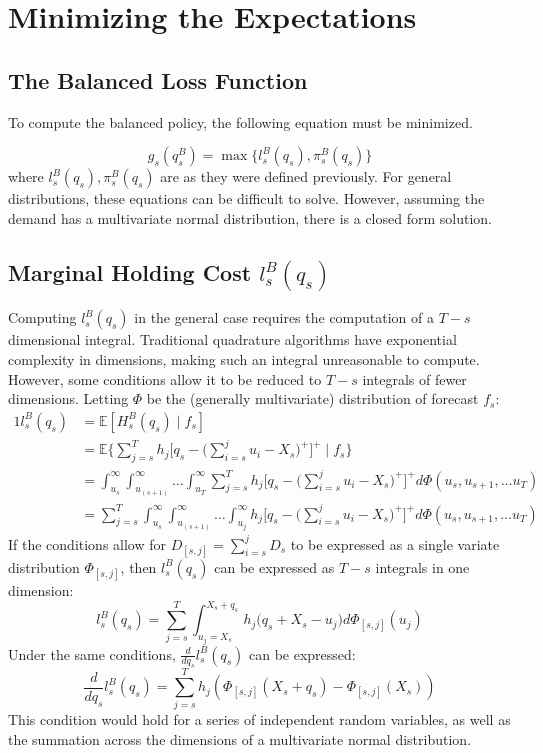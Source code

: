 \documentclass[12pt]{report}
\newcommand{\EX}{\mathbb{E}}
\begin{document}
\section{Minimizing the Expectations}

\subsection{The Balanced Loss Function}

To compute the balanced policy, the following equation must be minimized.

$$
	g_s(q_s^B) = \max\{l_s^B(q_s), \pi_s^B(q_s)\}
$$
where $l_s^B(q_s), \pi_s^B(q_s)$ are as they were defined previously. For general distributions, these equations can be difficult to solve. However, assuming the demand has a multivariate normal distribution, there is a closed form solution.  

\subsection{Marginal Holding Cost $l_s^B(q_s)$}

Computing $l_s^B(q_s)$ in the general case requires the computation of a $T - s$ dimensional integral. Traditional quadrature algorithms have exponential complexity in dimensions, making such an integral unreasonable to compute. However, some conditions allow it to be reduced to $T-s$ integrals of fewer dimensions. Letting $\Phi$ be the (generally multivariate) distribution of forecast $f_s$: 
\begin{alignat*}{1}
	l_s^B(q_s) &= \EX [H_s^B(q_s) \; | \; f_s] \\
        &= \EX \bigg\{\sum_{j=s}^T h_j\bigg[q_s - \bigg(\sum_{i=s}^j u_i - X_s\bigg)^+\bigg]^+  \; | \; f_s \bigg\} \\
		&= \int_{u_s}^{\infty} \int_{u_{(s+1)}}^{\infty}\dots \int_{u_T}^{\infty}\sum_{j=s}^T h_j\bigg[q_s - \bigg(\sum_{i=s}^j u_i - X_s\bigg)^+\bigg]^+ d\Phi(u_s, u_{s+1}, \dots u_T)\\
	   &= \sum_{j=s}^T \int_{u_s}^{\infty} \int_{u_{(s+1)}}^{\infty}\dots \int_{u_j}^{\infty} h_j\bigg[q_s - \bigg(\sum_{i=s}^j u_i - X_s\bigg)^+\bigg]^+ d\Phi(u_s, u_{s+1}, \dots u_T)
\end{alignat*}
If the conditions allow for $D_{[s, j]} = \sum_{i=s}^j D_s$ to be expressed as a single variate distribution $\Phi_{[s, j]}$, then $l_s^B(q_s)$ can be expressed as $T - s$ integrals in one dimension:
\begin{equation}
	l_s^B(q_s) = \sum_{j=s}^T \int_{u_j=X_s}^{X_s + q_s} h_j\bigg(q_s + X_s - u_j \bigg) d\Phi_{[s, j]}(u_j)
\end{equation}
Under the same conditions, $\frac{d}{d q_s} l_s^B(q_s)$ can be expressed:
\begin{equation}
	\frac{d}{d q_s} l_s^B(q_s) =  \sum_{j=s}^T h_j (\Phi_{[s, j]}(X_s + q_s) - \Phi_{[s, j]}(X_s))
\end{equation}
This condition would hold for a series of independent random variables, as well as the summation across the dimensions of a multivariate normal distribution. 
\end{document}

